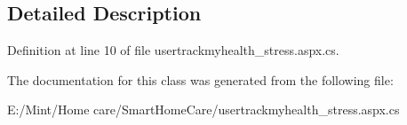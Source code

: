 \subsection{Detailed Description}


Definition at line 10 of file usertrackmyhealth\-\_\-stress.\-aspx.\-cs.



The documentation for this class was generated from the following file\-:\begin{DoxyCompactItemize}
\item 
E\-:/\-Mint/\-Home care/\-Smart\-Home\-Care/usertrackmyhealth\-\_\-stress.\-aspx.\-cs\end{DoxyCompactItemize}
